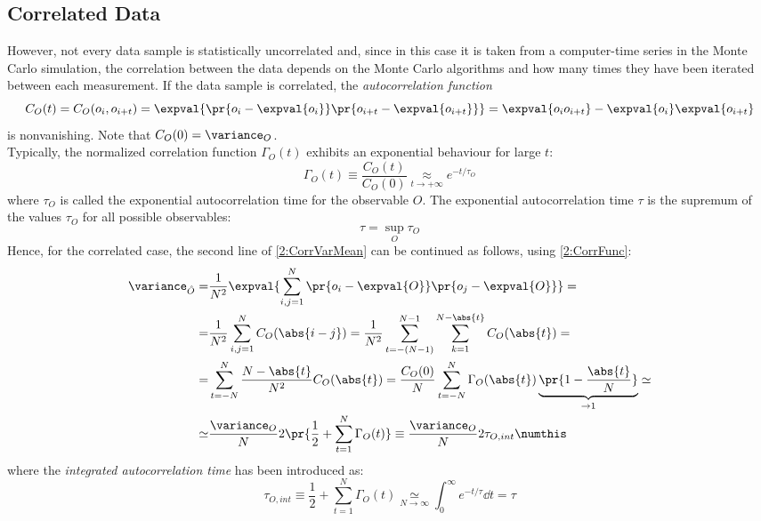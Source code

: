 \subsection{Correlated Data}
However, not every data sample is statistically uncorrelated and, since in this case it is taken from a computer-time series in the Monte Carlo simulation, the correlation between the data depends on the Monte Carlo algorithms and how many times they have been iterated between each measurement.
If the data sample is correlated, the \emph{autocorrelation function}
\begin{equation}
    C_O(t) = C_O(o_i,o_{i+t}) = \expval{\pr{o_i-\expval{o_i}}\pr{o_{i+t}-\expval{o_{i+t}}}} = \expval{o_io_{i+t}}-\expval{o_i}\expval{o_{i+t}} \label{2:CorrFunc}
\end{equation}
is nonvanishing.
Note that $C_O(0)=\variance_O$.\\
Typically, the normalized correlation function $\Gamma_O(t)$ exhibits an exponential behaviour for large $t$:
\begin{equation}
    \Gamma_O(t) \equiv \frac{C_O(t)}{C_O(0)} \underset{t\to+\infty}{\approx} e^{-t/\tau_O} \label{2:NormCorrFun}
\end{equation}
where $\tau_O$ is called the exponential autocorrelation time for the observable $O$.
The exponential autocorrelation time $\tau$ is the supremum of the values $\tau_O$ for all possible observables:
\begin{equation}
    \tau = \sup_O \tau_O \label{2:AutocorrTime}
\end{equation}
Hence, for the correlated case, the second line of \eqref{2:CorrVarMean} can be continued as follows, using \eqref{2:CorrFunc}:
\begin{align*}
    \variance_{\hat{O}} =& \frac1{N^2}\expval{\sum_{i,j=1}^N\pr{o_i-\expval{O}}\pr{o_j-\expval{O}}} = \\
    =& \frac1{N^2} \sum_{i,j=1}^N C_O(\abs{i-j}) = \frac1{N^2} \sum_{t=-(N-1)}^{N-1}\sum_{k=1}^{N-\abs{t}}C_O(\abs{t}) = \\
    =& \sum_{t=-N}^N \frac{N-\abs{t}}{N^2}C_O(\abs{t}) = \frac{C_O(0)}{N}\sum_{t=-N}^N \Gamma_O(\abs{t})\underbrace{\pr{1-\frac{\abs{t}}{N}}}_{\to1} \simeq \\
    \simeq& \frac{\variance_O}{N}2\pr{\frac12+\sum_{t=1}^N \Gamma_O(t)} \equiv \frac{\variance_O}{N} 2 \tau_{O,int} \numthis\label{2:VarianceCorr}
\end{align*}
where the \emph{integrated autocorrelation time} has been introduced as:
\begin{equation}
    \tau_{O,int} \equiv \frac12+\sum_{t=1}^N\Gamma_O(t) \underset{N\to\infty}{\simeq} \int_0^\infty e^{-t/\tau}\dd t = \tau \label{2:IntAutocorrTime}
\end{equation}
